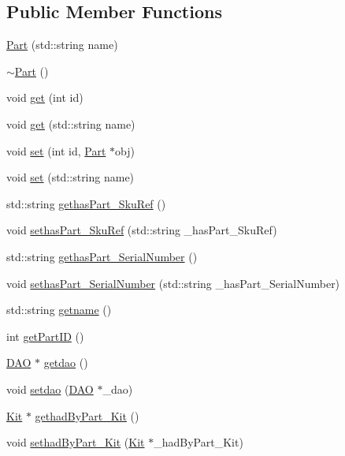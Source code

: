 \subsection*{Public Member Functions}
\begin{DoxyCompactItemize}
\item 
\hyperlink{class_part_aa41c326a64bb7fd6045ce9adb890f852}{Part} (std::string name)
\item 
\hyperlink{class_part_a1710faabd37355a2a4380b904ea37642}{$\sim$Part} ()
\item 
void \hyperlink{class_part_a71f8de3516d77afcbe33e0da374e1417}{get} (int id)
\item 
void \hyperlink{class_part_ab6dcd5abea7f0c70934fd70051054d7b}{get} (std::string name)
\item 
void \hyperlink{class_part_aa5aeaf78e3c11514af18e34eff77695f}{set} (int id, \hyperlink{class_part}{Part} $\ast$obj)
\item 
void \hyperlink{class_part_a4385ed9824f4ddcd64de6039357a0907}{set} (std::string name)
\item 
std::string \hyperlink{class_part_a1b1bac9be08923a838079b10248dbb5c}{gethasPart\_\-SkuRef} ()
\item 
void \hyperlink{class_part_ac2e874f2acbf6f7b5967b5ea6f251874}{sethasPart\_\-SkuRef} (std::string \_\-hasPart\_\-SkuRef)
\item 
std::string \hyperlink{class_part_a749826bbec15759938396e2ec1b2d53e}{gethasPart\_\-SerialNumber} ()
\item 
void \hyperlink{class_part_a04d79749bfcc2e1355315b0e9c5f7e95}{sethasPart\_\-SerialNumber} (std::string \_\-hasPart\_\-SerialNumber)
\item 
std::string \hyperlink{class_part_a298214c2287a508e2731964c9d902e1c}{getname} ()
\item 
int \hyperlink{class_part_a50fc70e2500a5636b83e65dd0d7aa55d}{getPartID} ()
\item 
\hyperlink{class_d_a_o}{DAO} $\ast$ \hyperlink{class_part_adcfa77d17d472eeed5aa6c32da15f48f}{getdao} ()
\item 
void \hyperlink{class_part_afb29f6cb972e3c442dfc551a334ab729}{setdao} (\hyperlink{class_d_a_o}{DAO} $\ast$\_\-dao)
\item 
\hyperlink{class_kit}{Kit} $\ast$ \hyperlink{class_part_a2469c88346d793604e68f24c1816681d}{gethadByPart\_\-Kit} ()
\item 
void \hyperlink{class_part_af86e9960fc00418e96215aa4f774f772}{sethadByPart\_\-Kit} (\hyperlink{class_kit}{Kit} $\ast$\_\-hadByPart\_\-Kit)

\end{DoxyCompactItemize}
